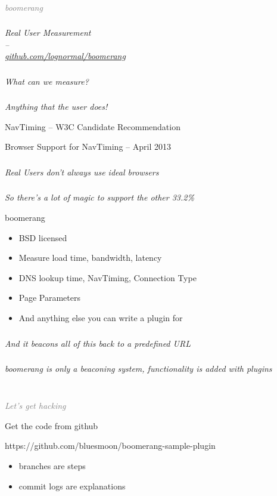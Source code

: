 \documentclass{beamer}
\newcommand{\innersplash}[1]{
  \begin{center}
    \Large \textrm{\textit{ #1 } }
  \end{center}
}
\newcommand{\splashslide}[2][{}]{
  \begin{frame}
  \frametitle{#1}
  \innersplash{#2}
  \end{frame}
}
\newcommand{\leadinslide}[2]{
  \splashslide{
     {\fontsize{150}{20}\selectfont{\raisebox{0pt}[90pt][0pt]{\textcolor{light-gray}{#1}}}} \\ \huge \textcolor{gray}{#2}
  }
}
\begin{document}
\leadinslide{1}{boomerang}

\splashslide{Real User Measurement \\ -- \\ \href{https://github.com/lognormal/boomerang/}{github.com/lognormal/boomerang}}

\splashslide{What can we measure?}

\splashslide{Anything that the user does!}

\begin{frame}{NavTiming -- W3C Candidate Recommendation}
\end{frame}

\begin{frame}{Browser Support for NavTiming -- April 2013}
\end{frame}

\splashslide{Real Users don't always use ideal browsers}

\splashslide{So there's a lot of magic to support the other 33.2\%}

\begin{frame}{boomerang}
  \begin{itemize}
    \item BSD licensed
    \item Measure load time, bandwidth, latency
    \item DNS lookup time, NavTiming, Connection Type
    \item Page Parameters
    \item And anything else you can write a plugin for
  \end{itemize}
\end{frame}

\splashslide{And it beacons all of this back to a predefined URL}

\splashslide{boomerang is only a beaconing system, functionality is added with plugins}

\leadinslide{2}{Let's get hacking}

\begin{frame}{Get the code from github}
\begin{center}
https://github.com/bluesmoon/boomerang-sample-plugin
\end{center}

\begin{itemize}
\item branches are steps
\item commit logs are explanations
\end{itemize}
\end{frame}
\end{document}
